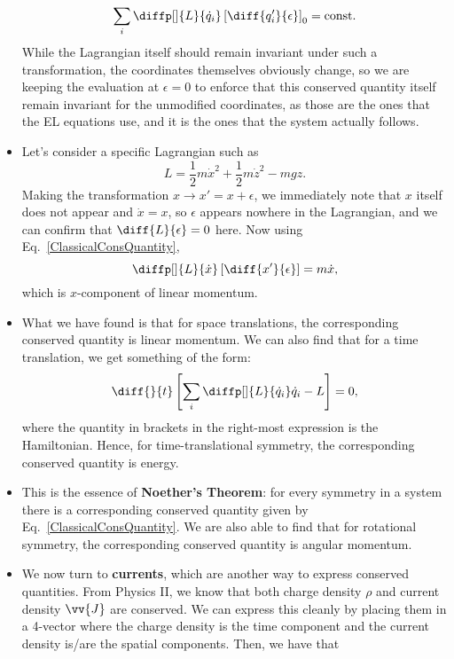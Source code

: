 \begin{itemize}
\begin{equation}
            \sum_i \diffp[]{L}{\dot{q}_i} \left[\diff{q_i'}{\epsilon}\right]_0 = \text{const}.\label{ClassicalConsQuantity}
        \end{equation}
        While the Lagrangian itself should remain invariant under such a transformation, the coordinates themselves obviously change, so we are keeping the evaluation at $\epsilon=0$ to enforce that this conserved quantity itself remain invariant for the unmodified coordinates, as those are the ones that the EL equations use, and it is the ones that the system actually follows.
    \item Let's consider a specific Lagrangian such as
        \begin{equation*}
            L = \frac{1}{2}m\dot{x}^2 + \frac{1}{2}m\dot{z}^2 - mgz.
        \end{equation*}
        Making the transformation $x \rightarrow x' = x + \epsilon$, we immediately note that $x$ itself does not appear and $\dot{x} = x$, so $\epsilon$ appears nowhere in the Lagrangian, and we can confirm that $\diff{L}{\epsilon}=0$ here.
        Now using Eq.~\eqref{ClassicalConsQuantity},
        \begin{equation*}
            \diffp[]{L}{\dot{x}}\left[\diff{x'}{\epsilon}\right] = m\dot{x},
        \end{equation*}
        which is $x$-component of linear momentum. 
    \item What we have found is that for space translations, the corresponding conserved quantity is linear momentum. We can also find that for a time translation, we get something of the form:
        \begin{equation*}
            \diff{}{t} \left[\sum_i \diffp[]{L}{\dot{q}_i}\dot{q}_i - L\right] = 0,
        \end{equation*}
        where the quantity in brackets in the right-most expression is the Hamiltonian. Hence, for time-translational symmetry, the corresponding conserved quantity is energy.
    \item This is the essence of \textbf{Noether's Theorem}: for every symmetry in a system there is a corresponding conserved quantity given by Eq.~\eqref{ClassicalConsQuantity}. We are also able to find that for rotational symmetry, the corresponding conserved quantity is angular momentum.
    \item We now turn to \textbf{currents}, which are another way to express conserved quantities. From Physics II, we know that both charge density $\rho$ and current density $\vv{J}$ are conserved. We can express this cleanly by placing them in a 4-vector where the charge density is the time component and the current density is/are the spatial components. Then, we have that

\end{itemize}
